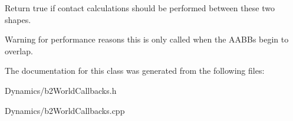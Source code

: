 Return true if contact calculations should be performed between these two shapes. \begin{DoxyWarning}{Warning}
for performance reasons this is only called when the A\+A\+B\+Bs begin to overlap. 
\end{DoxyWarning}


The documentation for this class was generated from the following files\+:\begin{DoxyCompactItemize}
\item 
Dynamics/b2\+World\+Callbacks.\+h\item 
Dynamics/b2\+World\+Callbacks.\+cpp\end{DoxyCompactItemize}
